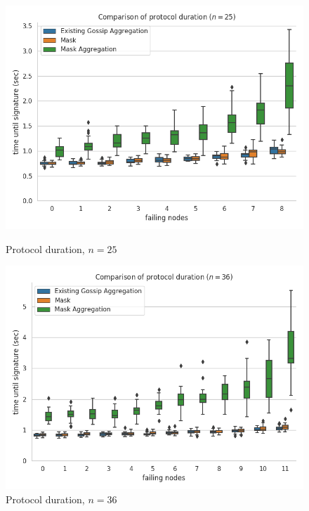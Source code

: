 \begin{figure}[H]
    \centering
    \begin{minipage}{0.5\textwidth}
        \centering
        \includegraphics[width=\textwidth]{images/aggregation_round_wall_sum_25.png}
        \captionsetup{labelformat=empty}
        \caption{Protocol duration, $n = 25$}
    \end{minipage}\hfill
    \begin{minipage}{0.5\textwidth}
        \centering
        \includegraphics[width=\textwidth]{images/aggregation_round_wall_sum_36.png}
        \captionsetup{labelformat=empty}
        \caption{Protocol duration, $n = 36$}
    \end{minipage}\hfill
\end{figure}


